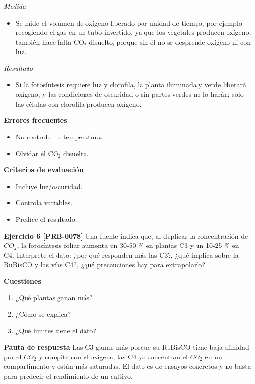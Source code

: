 \documentclass{book}
\begin{document}
\noindent\textit{Medida}
\begin{itemize}
\item Se mide el volumen de oxígeno liberado por unidad de tiempo, por ejemplo recogiendo el gas en un tubo invertido, ya que los vegetales producen oxígeno; también hace falta CO\({}_{2}\) disuelto, porque sin él no se desprende oxígeno ni con luz.
\end{itemize}

\noindent\textit{Resultado}
\begin{itemize}
\item Si la fotosíntesis requiere luz y clorofila, la planta iluminada y verde liberará oxígeno, y las condiciones de oscuridad o sin partes verdes no lo harán; solo las células con clorofila producen oxígeno.
\end{itemize}

\noindent\textbf{Errores frecuentes}
\begin{itemize}
\item No controlar la temperatura.
\item Olvidar el CO\({}_{2}\) disuelto.
\end{itemize}

\noindent\textbf{Criterios de evaluación}
\begin{itemize}
\item Incluye luz/oscuridad.
\item Controla variables.
\item Predice el resultado.
\end{itemize}

\noindent\textbf{Ejercicio 6 [PRB-0078]}
Una fuente indica que, al duplicar la concentración de \(CO_{2}\), la fotosíntesis foliar aumenta un 30-50 \% en plantas C3 y un 10-25 \% en C4. Interprete el dato: ¿por qué responden más las C3?, ¿qué implica sobre la RuBisCO y las vías C4?, ¿qué precauciones hay para extrapolarlo?


\noindent\textbf{Cuestiones}
\begin{enumerate}
\item ¿Qué plantas ganan más?
\item ¿Cómo se explica?
\item ¿Qué límites tiene el dato?
\end{enumerate}

\noindent\textbf{Pauta de respuesta}
Las C3 ganan más porque su RuBisCO tiene baja afinidad por el \(CO_{2}\) y compite con el oxígeno; las C4 ya concentran el \(CO_{2}\) en un compartimento y están más saturadas. El dato es de ensayos concretos y no basta para predecir el rendimiento de un cultivo.
\end{document}
